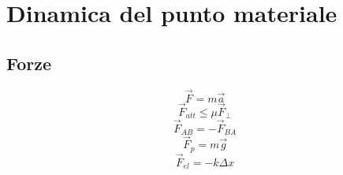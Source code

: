 \documentclass[../../dimostrazioni]{subfiles}
\begin{document}
    \chapter{Dinamica del punto materiale}

        \section*{Forze}
        
            \[ \vec{F} = m \vec{a}  \] %
            \[ \vec{F}_{att} \leq \mu \vec{F}_{\perp}  \]
            \[ \vec{F}_{AB} = - \vec{F}_{BA}  \] %
            \[ \vec{F}_{p} = m \vec{g}  \] %
            \[ \vec{F}_{el} = - k \Delta x  \]
        
\end{document}

